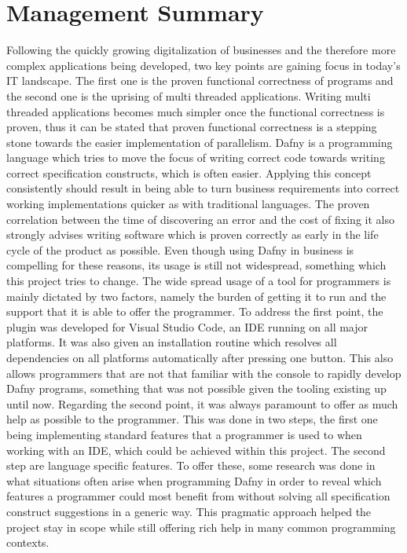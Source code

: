 \section{Management Summary}
Following the quickly growing digitalization of businesses and the therefore more complex applications being developed, two key points are gaining focus in today's IT landscape. The first one is the proven functional correctness of programs and the second one is the uprising of multi threaded applications. Writing multi threaded applications becomes much simpler once the functional correctness is proven, thus it can be stated that proven functional correctness is a stepping stone towards the easier implementation of parallelism. Dafny is a programming language which tries to move the focus of writing correct code towards writing correct specification constructs, which is often easier. Applying this concept consistently should result in being able to turn business requirements into correct working implementations quicker as with traditional languages. The proven correlation between the time of discovering an error and the cost of fixing it also strongly advises writing software which is proven correctly as early in the life cycle of the product as possible. Even though using Dafny in business is compelling for these reasons, its usage is still not widespread, something which this project tries to change.\newline
The wide spread usage of a tool for programmers is mainly dictated by two factors, namely the burden of getting it to run and the support that it is able to offer the programmer. \newline
To address the first point, the plugin was developed for Visual Studio Code, an IDE running on all major platforms. It was also given an installation routine which resolves all dependencies on all platforms automatically after pressing one button. This also allows programmers that are not that familiar with the console to rapidly develop Dafny programs, something that was not possible given the tooling existing up until now. \newline
Regarding the second point, it was always paramount to offer as much help as possible to the programmer. This was done in two steps, the first one being implementing standard features that a programmer is used to when working with an IDE, which could be achieved within this project. The second step are language specific features. To offer these, some research was done in what situations often arise when programming Dafny in order to reveal which features a programmer could most benefit from without solving all specification construct suggestions in a generic way. This pragmatic approach helped the project stay in scope while still offering rich help in many common programming contexts. \newline
